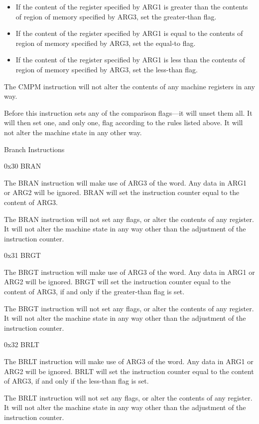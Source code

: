 \documentclass[]{article}
\providecommand{\tightlist}{%
  \setlength{\itemsep}{0pt}\setlength{\parskip}{0pt}}
\begin{document}
\begin{itemize}
\tightlist
\item
  If the content of the register specified by ARG1 is greater than the
  contents of region of memory specified by ARG3, set the greater-than
  flag.
\item
  If the content of the register specified by ARG1 is equal to the
  contents of region of memory specified by ARG3, set the equal-to flag.
\item
  If the content of the register specified by ARG1 is less than the
  contents of region of memory specified by ARG3, set the less-than
  flag.
\end{itemize}

The CMPM instruction will not alter the contents of any machine
registers in any way.

Before this instruction sets any of the comparison flags---it will unset
them all. It will then set one, and only one, flag according to the
rules listed above. It will not alter the machine state in any other
way.

Branch Instructions

0x30 BRAN

The BRAN instruction will make use of ARG3 of the word. Any data in ARG1
or ARG2 will be ignored. BRAN will set the instruction counter equal to
the content of ARG3.

The BRAN instruction will not set any flags, or alter the contents of
any register. It will not alter the machine state in any way other than
the adjustment of the instruction counter.

0x31 BRGT

The BRGT instruction will make use of ARG3 of the word. Any data in ARG1
or ARG2 will be ignored. BRGT will set the instruction counter equal to
the content of ARG3, if and only if the greater-than flag is set.~

The BRGT instruction will not set any flags, or alter the contents of
any register. It will not alter the machine state in any way other than
the adjustment of the instruction counter.

0x32 BRLT

The BRLT instruction will make use of ARG3 of the word. Any data in ARG1
or ARG2 will be ignored. BRLT will set the instruction counter equal to
the content of ARG3, if and only if the less-than flag is set.~

The BRLT instruction will not set any flags, or alter the contents of
any register. It will not alter the machine state in any way other than
the adjustment of the instruction counter.
\end{document}
